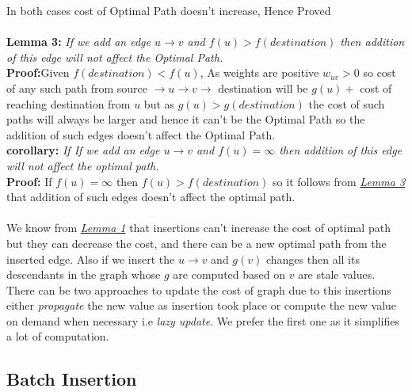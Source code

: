 \documentclass[a4paper]{article}
\begin{document}
In both cases cost of Optimal Path doesn't increase, Hence Proved\\
\\
\hypertarget{Lemma 3}{\textbf{Lemma 3:}} \textit{If we add an edge $u \rightarrow v$ and $f(u) > f(destination)$ then addition of this edge will not affect the Optimal Path.}\\
\textbf{Proof:}Given  $f(destination) < f(u)$, As weights are positive $w_{uv} > 0$ so cost of any such path from source $\rightarrow u \rightarrow v \rightarrow$ destination will be $g(u) + $ cost of reaching destination from $u$ but as $g(u) > g(destination)$ the cost of such paths will always be larger and hence it can't be the Optimal Path so the addition of such edges doesn't affect the Optimal Path.\\   
\textbf{corollary:} \textit{If If we add an edge $u \rightarrow v$ and $f(u) = \infty$ then addition of this edge will not affect the optimal path.}\\
\textbf{Proof:} If $f(u) = \infty$ then $f(u) > f(destination)$ so it follows from \hyperlink{Lemma 3}{\textit{Lemma 3}}  that addition of such edges doesn't affect the optimal path.\\
\\
We know from \hyperlink{Lemma 1}{\textit{Lemma 1}} that insertions can't increase the cost of optimal path but they can decrease the cost, and there can be a new optimal path from the inserted edge. Also if we insert the $u \rightarrow v$ and $g(v)$ changes then all its descendants in the graph whose $g$ are computed based on $v$ are stale values. There can be two approaches to update the cost of graph due to this insertions either \textit{propagate} the new value as insertion took place or compute the new value on demand when necessary i.e \textit{lazy update}. We prefer the first one as it simplifies a lot of computation.\\

\subsection{Batch Insertion}
\end{document}
